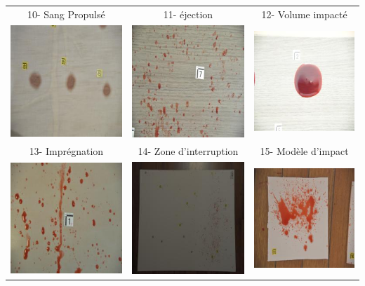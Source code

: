 \documentclass[a4paper]{article}
\begin{document}
\begin{table}[H]
\begin{tabular}{ccc}
        10- Sang Propulsé & 11- éjection & 12- Volume impacté \\
        \includegraphics[width=0.25\linewidth]{../asset/data_labo/13_carrelage_7374.jpg} & \includegraphics[width=0.25\linewidth]{../asset/data_labo/14_lino_6320.jpg} & \includegraphics[width=0.25\linewidth]{../asset/data_labo/15_p1040.jpg} \\
        13- Imprégnation & 14- Zone d'interruption & 15- Modèle d'impact \\
        \includegraphics[width=0.25\linewidth]{../asset/data_labo/16_carrelage_598.jpg} & \includegraphics[width=0.25\linewidth]{../asset/data_labo/17_papier_8323.jpg} & \includegraphics[width=0.25\linewidth]{../asset/data_labo/18_bois_4727.jpg}\\

\end{tabular}
\end{table}
\end{document}
